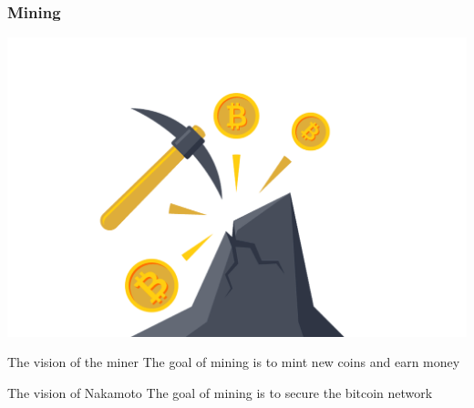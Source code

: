 \documentclass[11pt]{beamer}  %
\begin{document}
\begin{frame}\frametitle{Mining}

  \begin{center}
    \includegraphics[scale=0.1,clip=false]{pictures/mining.png}
  \end{center}

  \bigskip

  \begin{greenbox}{The vision of the miner}
    The goal of mining is to mint new coins and earn money
  \end{greenbox}

  \bigskip

  \begin{greenbox}{The vision of Nakamoto}
    The goal of mining is to secure the bitcoin network
  \end{greenbox}

\end{frame}
\end{document}
